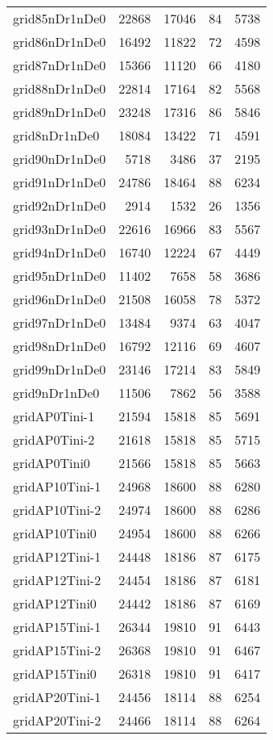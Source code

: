 \begin{longtable}{lrrrr}
grid85nDr1nDe0 & 22868 & 17046 & 84 & 5738 \\
grid86nDr1nDe0 & 16492 & 11822 & 72 & 4598 \\
grid87nDr1nDe0 & 15366 & 11120 & 66 & 4180 \\
grid88nDr1nDe0 & 22814 & 17164 & 82 & 5568 \\
grid89nDr1nDe0 & 23248 & 17316 & 86 & 5846 \\
grid8nDr1nDe0 & 18084 & 13422 & 71 & 4591 \\
grid90nDr1nDe0 & 5718 & 3486 & 37 & 2195 \\
grid91nDr1nDe0 & 24786 & 18464 & 88 & 6234 \\
grid92nDr1nDe0 & 2914 & 1532 & 26 & 1356 \\
grid93nDr1nDe0 & 22616 & 16966 & 83 & 5567 \\
grid94nDr1nDe0 & 16740 & 12224 & 67 & 4449 \\
grid95nDr1nDe0 & 11402 & 7658 & 58 & 3686 \\
grid96nDr1nDe0 & 21508 & 16058 & 78 & 5372 \\
grid97nDr1nDe0 & 13484 & 9374 & 63 & 4047 \\
grid98nDr1nDe0 & 16792 & 12116 & 69 & 4607 \\
grid99nDr1nDe0 & 23146 & 17214 & 83 & 5849 \\
grid9nDr1nDe0 & 11506 & 7862 & 56 & 3588 \\
gridAP0Tini-1 & 21594 & 15818 & 85 & 5691 \\
gridAP0Tini-2 & 21618 & 15818 & 85 & 5715 \\
gridAP0Tini0 & 21566 & 15818 & 85 & 5663 \\
gridAP10Tini-1 & 24968 & 18600 & 88 & 6280 \\
gridAP10Tini-2 & 24974 & 18600 & 88 & 6286 \\
gridAP10Tini0 & 24954 & 18600 & 88 & 6266 \\
gridAP12Tini-1 & 24448 & 18186 & 87 & 6175 \\
gridAP12Tini-2 & 24454 & 18186 & 87 & 6181 \\
gridAP12Tini0 & 24442 & 18186 & 87 & 6169 \\
gridAP15Tini-1 & 26344 & 19810 & 91 & 6443 \\
gridAP15Tini-2 & 26368 & 19810 & 91 & 6467 \\
gridAP15Tini0 & 26318 & 19810 & 91 & 6417 \\
gridAP20Tini-1 & 24456 & 18114 & 88 & 6254 \\
gridAP20Tini-2 & 24466 & 18114 & 88 & 6264 \\

\end{longtable}
